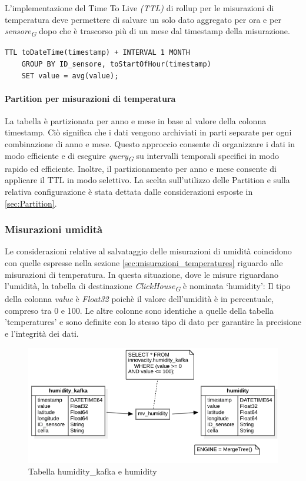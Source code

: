 L'implementazione del Time To Live \textit{(TTL)} di rollup per le misurazioni di temperatura deve permettere di salvare un solo dato aggregato per ora e per \textit{sensore}\textsubscript{\textit{G}} dopo che è trascorso più di un mese dal timestamp della misurazione.

\begin{lstlisting}[caption={implementazione TTL tabella temperatures}, captionpos=b]
    TTL toDateTime(timestamp) + INTERVAL 1 MONTH
	GROUP BY ID_sensore, toStartOfHour(timestamp)
	SET value = avg(value);
\end{lstlisting}

\paragraph{Partition per misurazioni di temperatura}\label{sec:temp_part}
La tabella è partizionata per anno e mese in base al valore della colonna timestamp. Ciò significa che i dati vengono archiviati in parti separate per ogni combinazione di anno e mese. Questo approccio consente di organizzare i dati in modo efficiente e di eseguire \textit{query}\textsubscript{\textit{G}} su intervalli temporali specifici in modo rapido ed efficiente. Inoltre, il partizionamento per anno e mese consente di applicare il TTL in modo selettivo.
La scelta sull'utilizzo delle Partition e sulla relativa configurazione è stata dettata dalle considerazioni esposte in \ref{sec:Partition}.


\subsubsection{Misurazioni umidità}
Le considerazioni relative al salvataggio delle misurazioni di umidità coincidono con quelle espresse nella sezione \ref{sec:misurazioni_temperatures} riguardo alle misurazioni di temperatura.
In questa situazione, dove le misure riguardano l’umidità, la tabella di destinazione \textit{ClickHouse}\textsubscript{\textit{G}} è nominata ‘humidity’:
Il tipo della colonna \textit{value} è \textit{Float32} poichè il valore dell'umidità è in percentuale, compreso tra 0 e 100. Le altre colonne sono identiche a quelle della tabella 'temperatures' e sono definite con lo stesso tipo di dato per garantire la precisione e l'integrità dei dati.
\begin{figure}[H]
    \centering
    \includegraphics[width=1\textwidth]{../Images/SpecificaTecnica/humidity.png}
    \caption{Tabella humidity\_kafka e humidity}
    \label{fig:humidity_tables}
  \end{figure}

